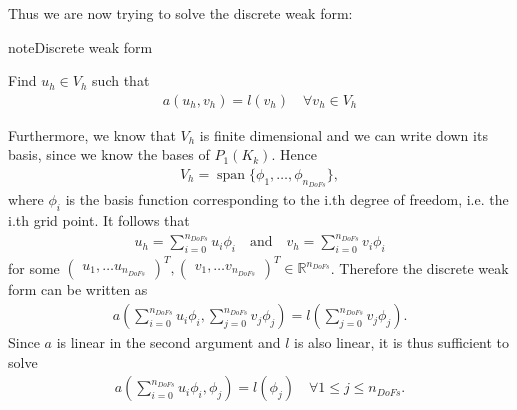 \documentclass[letterpaper,10pt,english, openany]{sphinxmanual}
\begin{document}
Thus we are now trying to solve the discrete weak form:

\begin{sphinxadmonition}{note}{Discrete weak form}

Find \(u_h \in V_h\) such that
\begin{equation*}
\begin{split}a(u_h,v_h) = l(v_h) \quad \forall v_h \in V_h\end{split}
\end{equation*}\end{sphinxadmonition}

Furthermore, we know that \(V_h\) is finite dimensional and we can write down its basis, since we know the bases of \(P_1(K_k)\).
Hence
\begin{equation*}
\begin{split}V_h = \operatorname{span}\{ \phi_1, \dots, \phi_{n_{DoFs}} \},\end{split}
\end{equation*}
where \(\phi_i\) is the basis function corresponding to the i.th degree of freedom, i.e. the i.th grid point. It follows that
\begin{equation*}
\begin{split}u_h = \sum_{i= 0}^{n_{DoFs}} u_i \phi_i \quad \text{and} \quad v_h = \sum_{i= 0}^{n_{DoFs}} v_i \phi_i\end{split}
\end{equation*}
for some \(\begin{pmatrix}u_1, \dots u_{n_{DoFs}}\end{pmatrix}^T, \begin{pmatrix}v_1, \dots v_{n_{DoFs}}\end{pmatrix}^T \in \mathbb{R}^{n_{DoFs}}\). Therefore the discrete weak form can be written as
\begin{equation*}
\begin{split}a\left(\sum_{i= 0}^{n_{DoFs}} u_i \phi_i,\sum_{j= 0}^{n_{DoFs}} v_j \phi_j \right) = l\left(\sum_{j= 0}^{n_{DoFs}} v_j \phi_j \right).\end{split}
\end{equation*}
Since \(a\) is linear in the second argument and \(l\) is also linear, it is thus sufficient to solve
\begin{equation*}
\begin{split}a\left(\sum_{i= 0}^{n_{DoFs}} u_i \phi_i,\phi_j \right) = l\left(\phi_j \right) \quad \forall 1 \leq j \leq n_{DoFs}.\end{split}
\end{equation*}
\end{document}
